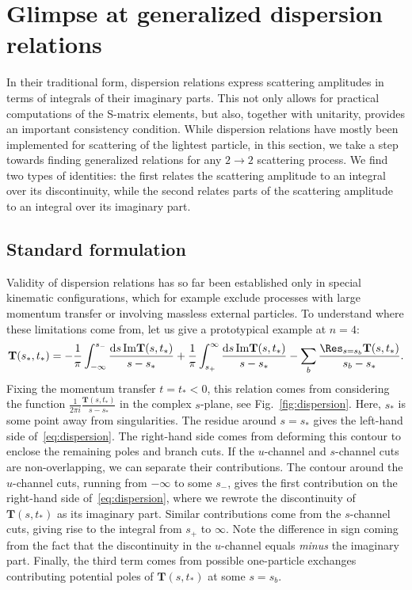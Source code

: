 \documentclass[12pt]{article}
\numberwithin{figure}{section}
\def \be {\begin{equation}}
\def \ee {\end{equation}}
\def \d {\mathrm{d}}
\def \Im {\mathrm{Im}}
\def \T {\mathbf{T}}
\begin{document}
	
	\newpage
	\section{\label{sec:dispersion}Glimpse at generalized dispersion relations}
	
	In their traditional form, dispersion relations express scattering amplitudes in terms of integrals of their imaginary parts. This not only allows for practical computations of the S-matrix elements, but also, together with unitarity, provides an important consistency condition. While dispersion relations have mostly been implemented for scattering of the lightest particle, in this section, we take a step towards finding generalized relations for any $2\to 2$ scattering process. We find two types of identities: the first relates the scattering amplitude to an integral over its discontinuity, while the second relates parts of the scattering amplitude to an integral over its imaginary part.
	
	\subsection{Standard formulation}
	
	Validity of dispersion relations has so far been established only in special kinematic configurations, which for example exclude processes with large momentum transfer or involving massless external particles. To understand where these limitations come from, let us give a prototypical example at $n=4$:
	\be\label{eq:dispersion}
	\T(s_\ast, t_\ast) = -\frac{1}{\pi}\int_{-\infty}^{s_-} \frac{\d s\, \Im \T(s, t_\ast)}{s - s_\ast} + \frac{1}{\pi}\int_{s_+}^{\infty} \frac{\d s\, \Im \T(s, t_\ast)}{s - s_\ast} - \sum_{b} \frac{\Res_{s=s_b} \T(s,t_\ast)}{s_b - s_\ast}.
	\ee
	Fixing the momentum transfer $t = t_\ast < 0$, this relation comes from considering the function $\frac{1}{2\pi i} \tfrac{\T(s,t_\ast)}{s-s_\ast}$ in the complex $s$-plane, see Fig.~\ref{fig:dispersion}. Here, $s_\ast$ is some point away from singularities. The residue around $s=s_\ast$ gives the left-hand side of~\eqref{eq:dispersion}. The right-hand side comes from deforming this contour to enclose the remaining poles and branch cuts. If the $u$-channel and $s$-channel cuts are non-overlapping, we can separate their contributions. The contour around the $u$-channel cuts, running from $-\infty$ to some $s_-$, gives the first contribution on the right-hand side of~\eqref{eq:dispersion}, where we rewrote the discontinuity of $\T(s,t_\ast)$ as its imaginary part. Similar contributions come from the $s$-channel cuts, giving rise to the integral from $s_+$ to $\infty$. Note the difference in sign coming from the fact that the discontinuity in the $u$-channel equals \emph{minus} the imaginary part. Finally, the third term comes from possible one-particle exchanges contributing potential poles of $\T(s,t_\ast)$ at some $s = s_b$.
	
\end{document}
